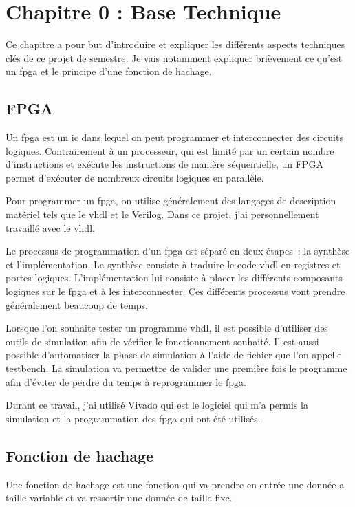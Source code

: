 \chapter{Chapitre 0 : Base Technique}

Ce chapitre a pour but d'introduire et expliquer les différents aspects techniques clés de ce projet de semestre. Je vais notamment expliquer brièvement ce qu'est un \gls{fpga} et le principe d'une fonction de hachage.

\section{FPGA}
Un \gls{fpga} est un \gls{ic} dans lequel on peut programmer et interconnecter des circuits logiques. Contrairement à un processeur, qui est limité par un certain nombre d'instructions et exécute les instructions de manière séquentielle, un FPGA permet d'exécuter de nombreux circuits logiques en parallèle.

Pour programmer un \gls{fpga}, on utilise généralement des langages de description matériel tels que le \gls{vhdl} et le Verilog. Dans ce projet, j'ai personnellement travaillé avec le \gls{vhdl}.

Le processus de programmation d'un \gls{fpga} est séparé en deux étapes : la synthèse et l'implémentation. 
La synthèse consiste à traduire le code \gls{vhdl} en registres et portes logiques. 
L'implémentation lui consiste à placer les différents composants logiques sur le \gls{fpga} et à les interconnecter.
Ces différents processus vont prendre généralement beaucoup de temps.

Lorsque l'on souhaite tester un programme \gls{vhdl}, il est possible d'utiliser des outils de simulation afin de vérifier le fonctionnement souhaité. Il est aussi possible d'automatiser la phase de simulation à l'aide de fichier que l'on appelle testbench.
La simulation va permettre de valider une première fois le programme afin d'éviter de perdre du temps à reprogrammer le \gls{fpga}.

Durant ce travail, j'ai utilisé Vivado qui est le logiciel qui m'a permis la simulation et la programmation des \gls{fpga} qui ont été utilisés. 



\section{Fonction de hachage}

Une fonction de hachage est une fonction qui va prendre en entrée une donnée a taille variable et va ressortir une donnée de taille fixe. 

